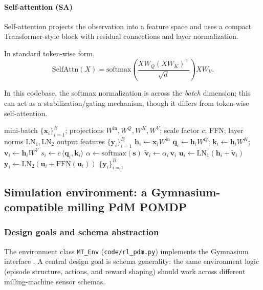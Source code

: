 \documentclass[sn-basic]{sn-jnl} %
\begin{document}
\paragraph{Self-attention (SA)}
Self-attention projects the observation into a feature space and uses a compact Transformer-style block with residual connections and layer normalization.

In standard token-wise form,
\begin{equation}
\mathrm{SelfAttn}(X)=\mathrm{softmax}\left(\frac{XW_Q(XW_K)^\top}{\sqrt{d}}\right)XW_V.
\end{equation}

In this codebase, the softmax normalization is across the \emph{batch} dimension; this can act as a stabilization/gating mechanism, though it differs from token-wise self-attention.

\begin{algorithm}[t]
\caption{Self-attention feature extractor (forward pass; batch-normalized gating)}
\label{alg:sa_forward}
\begin{algorithmic}[1]
\Require mini-batch $\{\mathbf{x}_i\}_{i=1}^{B}$; projections $W^{\mathrm{in}},W^Q,W^K,W^V$; scale factor $c$; FFN; layer norms $\mathrm{LN}_1,\mathrm{LN}_2$
\Ensure output features $\{\mathbf{y}_i\}_{i=1}^{B}$
        \State $\mathbf{h}_i \gets \mathbf{x}_i W^{\mathrm{in}}$
        \State $\mathbf{q}_i \gets \mathbf{h}_i W^Q$; $\mathbf{k}_i \gets \mathbf{h}_i W^K$; $\mathbf{v}_i \gets \mathbf{h}_i W^V$
        \State $s_i \gets c\,\langle \mathbf{q}_i,\mathbf{k}_i\rangle$ 
\EndFor
\State $\alpha \gets \mathrm{softmax}(\mathbf{s})$ 
        \State $\tilde{\mathbf{v}}_i \gets \alpha_i\,\mathbf{v}_i$
        \State $\mathbf{u}_i \gets \mathrm{LN}_1(\mathbf{h}_i + \tilde{\mathbf{v}}_i)$
        \State $\mathbf{y}_i \gets \mathrm{LN}_2(\mathbf{u}_i + \mathrm{FFN}(\mathbf{u}_i))$
\EndFor
\State \Return $\{\mathbf{y}_i\}_{i=1}^{B}$
\end{algorithmic}
\end{algorithm}

\subsection{Simulation environment: a Gymnasium-compatible milling PdM POMDP}
\label{sec:env}
\subsubsection{Design goals and schema abstraction}
The environment class \texttt{MT\_Env} (\texttt{code/rl\_pdm.py}) implements the Gymnasium interface \cite{Foundation2023}. A central design goal is schema generality: the same environment logic (episode structure, actions, and reward shaping) should work across different milling-machine sensor schemas.
\end{document}
